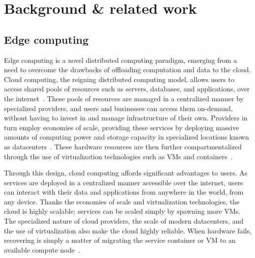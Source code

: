 \section{Background \& related work}

\subsection{Edge computing}

Edge computing is a novel distributed computing paradigm, emerging from a need to overcome the drawbacks of offloading computation and data to the cloud.
Cloud computing, the reigning distributed computing model, allows users to access shared pools of resources such as servers, databases, and applications, over the internet~\cite{gai2012towards}.
These pools of resources are managed in a centralized manner by specialized providers, and users and businesses can access them on-demand, without having to invest in and manage infrastructure of their own.
Providers in turn employ economies of scale, providing these services by deploying massive amounts of computing power and storage capacity in specialized locations known as datacenters~\citationeeded.
These hardware resources are then further compartmentalized through the use of virtualization technologies such as \glspl{VM} and containers~\cite{gai2012towards}.

Through this design, cloud computing affords significant advantages to users.
As services are deployed in a centralized manner accessible over the internet, users can interact with their data and applications from anywhere in the world, from any device.
Thanks the economies of scale and virtualization technologies, the cloud is highly scalable;
services can be scaled simply by spawning more \glspl{VM}.
The specialized nature of cloud providers, the scale of modern datacenters, and the use of virtualization also make the cloud highly reliable.
When hardware fails, recovering is simply a matter of migrating the service container or \gls{VM} to an available compute node~\cite{endo2016high}.

